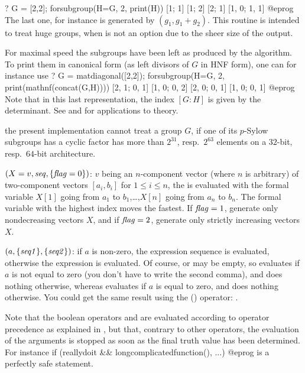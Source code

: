 \bprog
? G = [2,2]; forsubgroup(H=G, 2, print(H))
[1; 1]
[1; 2]
[2; 1]
[1, 0; 1, 1]
@eprog
The last one, for instance is generated by $(g_1, g_1 + g_2)$. This
routine is intended to treat huge groups, when  is not an
option due to the sheer size of the output.

For maximal speed the subgroups have been left as produced by the algorithm.
To print them in canonical form (as left divisors of $G$ in
HNF form), one can for instance use
\bprog
? G = matdiagonal([2,2]); forsubgroup(H=G, 2, print(mathnf(concat(G,H))))
[2, 1; 0, 1]
[1, 0; 0, 2]
[2, 0; 0, 1]
[1, 0; 0, 1]
@eprog\noindent
Note that in this last representation, the index $[G:H]$ is given by the
determinant. See  and  for
 applications to  theory.

 the present implementation cannot treat a group $G$, if
one of its $p$-Sylow subgroups has a cyclic factor has more than $2^{31}$,
resp.~$2^{63}$ elements on a $32$-bit, resp.~$64$-bit architecture.

$(X=v,\hbox{\it seq\/},\{\hbox{\it f\kern0pt lag\/}=0\})$: $v$ being an $n$-component
vector (where $n$ is arbitrary) of two-component vectors $[a_i,b_i]$
for $1\le i\le n$, the  is evaluated with the formal variable
$X[1]$ going from $a_1$ to $b_1$,\dots,$X[n]$ going from $a_n$ to $b_n$.
The formal variable with the highest index moves the fastest. If $\hbox{\it f\kern0pt lag\/}=1$,
generate only nondecreasing vectors $X$, and if $\hbox{\it f\kern0pt lag\/}=2$, generate only
strictly increasing vectors $X$.

$(a,\{\hbox{\it seq1\/}\},\{\hbox{\it seq2\/}\})$: if $a$ is non-zero,
the expression sequence  is evaluated, otherwise the expression
 is evaluated. Of course,  or  may be empty,
so  evaluates  if $a$ is not equal to zero
(you don't have to write the second comma), and does nothing otherwise,
whereas  evaluates  if $a$ is equal to
zero, and does nothing otherwise. You could get the same result using
the \kbd{!} () operator: .

  Note that the boolean operators \kbd{\&\&} and \kbd{||} are evaluated
according to operator precedence as explained in , but
that, contrary to other operators, the evaluation of the arguments is
stopped as soon as the final truth value has been determined. For instance
\bprog
if (reallydoit && longcomplicatedfunction(), ...)%
@eprog
\noindent is a perfectly safe statement.

